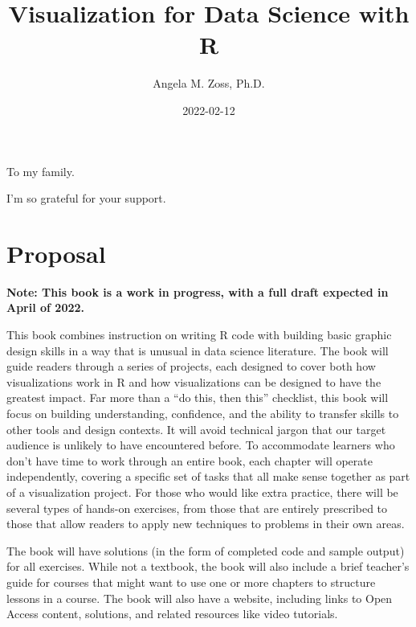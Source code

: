 \documentclass[
]{krantz}
\title{Visualization for Data Science with R}
\author{Angela M. Zoss, Ph.D.}
\date{2022-02-12}
\begin{document}
\maketitle


\thispagestyle{empty}

\begin{center}
To my family.

I'm so grateful for your support.
\end{center}

\setlength{\abovedisplayskip}{-5pt}
\setlength{\abovedisplayshortskip}{-5pt}

{
\hypersetup{linkcolor=}
\setcounter{tocdepth}{2}
\tableofcontents
}
\listoftables
\listoffigures
\hypertarget{proposal}{%
\chapter*{Proposal}\label{proposal}}


\textbf{Note: This book is a work in progress, with a full draft expected in April of 2022.}

This book combines instruction on writing R code with building basic graphic design skills in a way that is unusual in data science literature. The book will guide readers through a series of projects, each designed to cover both how visualizations work in R and how visualizations can be designed to have the greatest impact. Far more than a ``do this, then this'' checklist, this book will focus on building understanding, confidence, and the ability to transfer skills to other tools and design contexts. It will avoid technical jargon that our target audience is unlikely to have encountered before. To accommodate learners who don't have time to work through an entire book, each chapter will operate independently, covering a specific set of tasks that all make sense together as part of a visualization project. For those who would like extra practice, there will be several types of hands-on exercises, from those that are entirely prescribed to those that allow readers to apply new techniques to problems in their own areas.

The book will have solutions (in the form of completed code and sample output) for all exercises. While not a textbook, the book will also include a brief teacher's guide for courses that might want to use one or more chapters to structure lessons in a course. The book will also have a website, including links to Open Access content, solutions, and related resources like video tutorials.
\end{document}

